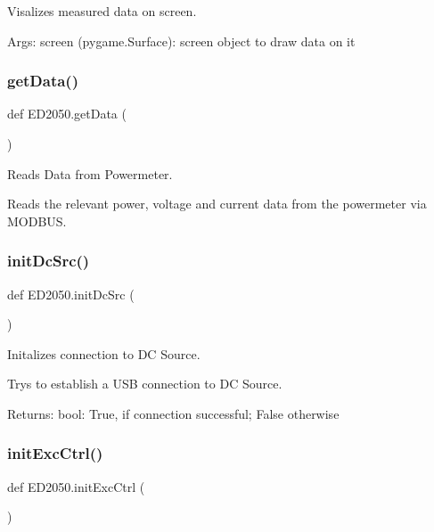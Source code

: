 \begin{DoxyVerb}Visalizes measured data on screen.

Args:
    screen (pygame.Surface): screen object to draw data on it\end{DoxyVerb}
 \mbox{\label{namespaceED2050_ab751c672fcc67e06faadcc7d0ba32951}} 
\subsubsection{\texorpdfstring{get\+Data()}{getData()}}
{\footnotesize\ttfamily def E\+D2050.\+get\+Data (\begin{DoxyParamCaption}{ }\end{DoxyParamCaption})}

\begin{DoxyVerb}Reads Data from Powermeter.

Reads the relevant power, voltage and current data from the powermeter
via MODBUS.
\end{DoxyVerb}
 \mbox{\label{namespaceED2050_ab9da13b2f573c582bd96cbb271f0be50}} 
\subsubsection{\texorpdfstring{init\+Dc\+Src()}{initDcSrc()}}
{\footnotesize\ttfamily def E\+D2050.\+init\+Dc\+Src (\begin{DoxyParamCaption}{ }\end{DoxyParamCaption})}

\begin{DoxyVerb}Initalizes connection to DC Source.

Trys to establish a USB connection to DC Source.

Returns:
    bool: True, if connection successful; False otherwise
\end{DoxyVerb}
 \mbox{\label{namespaceED2050_a07cbbb54c003e04ab8ba03bee8b3a545}} 
\subsubsection{\texorpdfstring{init\+Exc\+Ctrl()}{initExcCtrl()}}
{\footnotesize\ttfamily def E\+D2050.\+init\+Exc\+Ctrl (\begin{DoxyParamCaption}{ }\end{DoxyParamCaption})}

